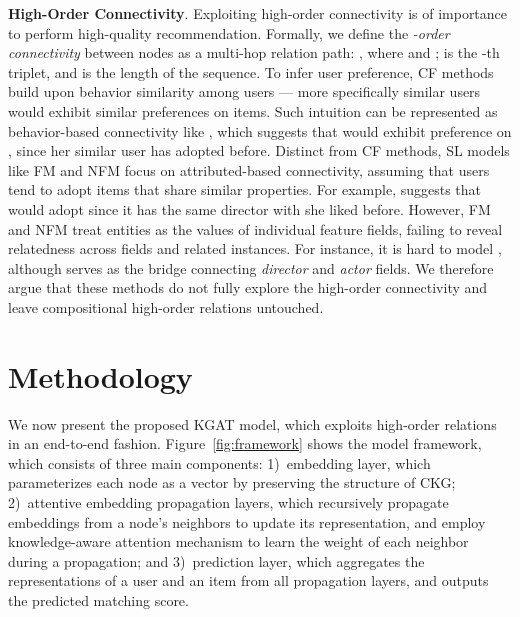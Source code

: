 \documentclass[sigconf]{acmart}
\theoremstyle{definition}
\begin{document}
\vspace{5px}
\noindent\textbf{High-Order Connectivity}.
Exploiting high-order connectivity is of importance to perform high-quality recommendation.
Formally, we define the \emph{-order connectivity} between nodes as a multi-hop relation path: , where  and ;
 is the -th triplet, and  is the length of the sequence.
To infer user preference, CF methods build upon behavior similarity among users --- more specifically similar users would exhibit similar preferences on items.
Such intuition can be represented as behavior-based connectivity like ,
which suggests that  would exhibit preference on , since her similar user  has adopted  before.
Distinct from CF methods, SL models like FM and NFM focus on attributed-based connectivity, assuming that users tend to adopt items that share similar properties.
For example,  suggests that  would adopt  since it has the same director  with  she liked before.
However, FM and NFM treat entities as the values of individual feature fields, failing to reveal relatedness across fields and related instances.
For instance, it is hard to model , although  serves as the bridge connecting \emph{director} and \emph{actor} fields.
We therefore argue that these methods do not fully explore the high-order connectivity and leave compositional high-order relations untouched.





































%
 \section{Methodology}



We now present the proposed KGAT model, which exploits high-order relations in an end-to-end fashion.
Figure~\ref{fig:framework} shows the model framework, which consists of three main components:
1)~embedding layer, which parameterizes each node as a vector by preserving the structure of CKG;
2)~attentive embedding propagation layers, which recursively propagate embeddings from a node's neighbors to update its representation, and employ knowledge-aware attention mechanism to learn the weight of each neighbor during a propagation;
and 3)~prediction layer, which aggregates the representations of a user and an item from all propagation layers, and outputs the predicted matching score.
\end{document}
